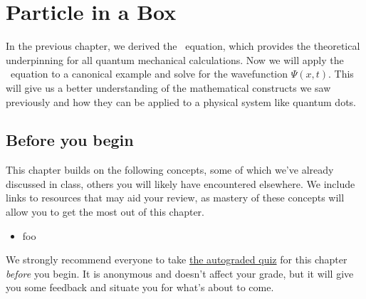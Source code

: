 

%

\chapter{Particle in a Box} \label{ch:box}

In the previous chapter, we derived the \Sch\ equation, which provides the theoretical underpinning for all quantum mechanical calculations. 
Now we will apply the \Sch\ equation to a canonical example and solve for the wavefunction $\Psi(x,t)$. 
This will give us a better understanding of the mathematical constructs we saw previously and how they can be applied to a physical system like quantum dots.


\section{Before you begin}

This chapter builds on the following concepts, some of which we've already discussed in class, others you will likely have encountered elsewhere.
We include links to resources that may aid your review, as mastery of these concepts will allow you to get the most out of this chapter.

\begin{itemize}
	\item foo
\end{itemize}

\begin{tcolorbox}[colframe=PaloAlto, colbacktitle=PaloAlto!20!white, title=Pre-check quiz]
	We strongly recommend everyone to take \href{TODO}{the autograded quiz} for this chapter \emph{before} you begin.
	It is anonymous and doesn't affect your grade, but it will give you some feedback and situate you for what's about to come.
\end{tcolorbox}


